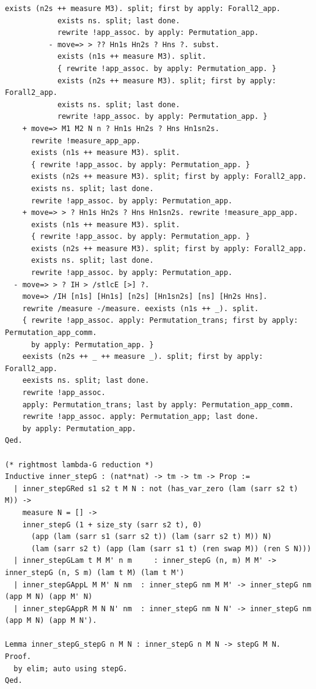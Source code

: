 \begin{lstlisting}[style=authorcoq]
            exists (n2s ++ measure M3). split; first by apply: Forall2_app.
            exists ns. split; last done.
            rewrite !app_assoc. by apply: Permutation_app.
          - move=> > ?? Hn1s Hn2s ? Hns ?. subst.
            exists (n1s ++ measure M3). split.
            { rewrite !app_assoc. by apply: Permutation_app. }
            exists (n2s ++ measure M3). split; first by apply: Forall2_app.
            exists ns. split; last done.
            rewrite !app_assoc. by apply: Permutation_app. }
    + move=> M1 M2 N n ? Hn1s Hn2s ? Hns Hn1sn2s.
      rewrite !measure_app_app.
      exists (n1s ++ measure M3). split.
      { rewrite !app_assoc. by apply: Permutation_app. }
      exists (n2s ++ measure M3). split; first by apply: Forall2_app.
      exists ns. split; last done.
      rewrite !app_assoc. by apply: Permutation_app.
    + move=> > ? Hn1s Hn2s ? Hns Hn1sn2s. rewrite !measure_app_app.
      exists (n1s ++ measure M3). split.
      { rewrite !app_assoc. by apply: Permutation_app. }
      exists (n2s ++ measure M3). split; first by apply: Forall2_app.
      exists ns. split; last done.
      rewrite !app_assoc. by apply: Permutation_app.
  - move=> > ? IH > /stlcE [>] ?.
    move=> /IH [n1s] [Hn1s] [n2s] [Hn1sn2s] [ns] [Hn2s Hns].
    rewrite /measure -/measure. eexists (n1s ++ _). split.
    { rewrite !app_assoc. apply: Permutation_trans; first by apply: Permutation_app_comm.
      by apply: Permutation_app. }
    eexists (n2s ++ _ ++ measure _). split; first by apply: Forall2_app.
    eexists ns. split; last done.
    rewrite !app_assoc.
    apply: Permutation_trans; last by apply: Permutation_app_comm.
    rewrite !app_assoc. apply: Permutation_app; last done.
    by apply: Permutation_app.
Qed.

(* rightmost lambda-G reduction *)
Inductive inner_stepG : (nat*nat) -> tm -> tm -> Prop :=
  | inner_stepGRed s1 s2 t M N : not (has_var_zero (lam (sarr s2 t) M)) ->
    measure N = [] ->
    inner_stepG (1 + size_sty (sarr s2 t), 0)
      (app (lam (sarr s1 (sarr s2 t)) (lam (sarr s2 t) M)) N)
      (lam (sarr s2 t) (app (lam (sarr s1 t) (ren swap M)) (ren S N)))
  | inner_stepGLam t M M' n m     : inner_stepG (n, m) M M' -> inner_stepG (n, S m) (lam t M) (lam t M')
  | inner_stepGAppL M M' N nm  : inner_stepG nm M M' -> inner_stepG nm (app M N) (app M' N)
  | inner_stepGAppR M N N' nm  : inner_stepG nm N N' -> inner_stepG nm (app M N) (app M N').

Lemma inner_stepG_stepG n M N : inner_stepG n M N -> stepG M N.
Proof.
  by elim; auto using stepG.
Qed.


\end{lstlisting}
